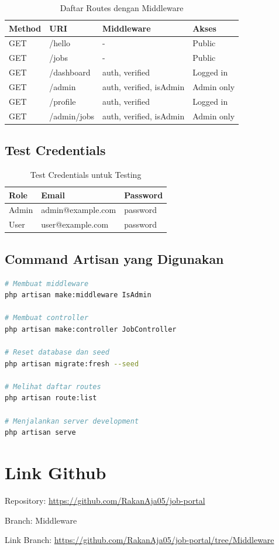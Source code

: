 \documentclass[a4paper,oneside,11pt]{book}
\begin{document}
\begin{table}[H]
\centering
\begin{tabular}{|l|l|l|l|}
\hline
\textbf{Method} & \textbf{URI} & \textbf{Middleware} & \textbf{Akses} \\
\hline
GET & /hello & - & Public \\
GET & /jobs & - & Public \\
GET & /dashboard & auth, verified & Logged in \\
GET & /admin & auth, verified, isAdmin & Admin only \\
GET & /profile & auth, verified & Logged in \\
GET & /admin/jobs & auth, verified, isAdmin & Admin only \\
\hline
\end{tabular}
\caption{Daftar Routes dengan Middleware}
\end{table}

\section{Test Credentials}

\begin{table}[H]
\centering
\begin{tabular}{|l|l|l|}
\hline
\textbf{Role} & \textbf{Email} & \textbf{Password} \\
\hline
Admin & admin@example.com & password \\
User & user@example.com & password \\
\hline
\end{tabular}
\caption{Test Credentials untuk Testing}
\end{table}

\section{Command Artisan yang Digunakan}

\begin{lstlisting}[language=bash]
# Membuat middleware
php artisan make:middleware IsAdmin

# Membuat controller
php artisan make:controller JobController

# Reset database dan seed
php artisan migrate:fresh --seed

# Melihat daftar routes
php artisan route:list

# Menjalankan server development
php artisan serve
\end{lstlisting}

\chapter{Link Github}

Repository: \url{https://github.com/RakanAja05/job-portal}

Branch: Middleware

Link Branch: \url{https://github.com/RakanAja05/job-portal/tree/Middleware}
\end{document}
